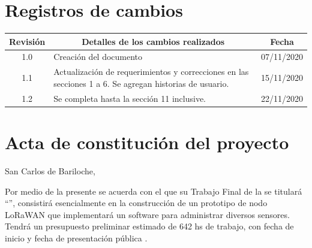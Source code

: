 \documentclass[11pt]{charter}
\begin{document}
\maketitle
\thispagestyle{empty}
\pagebreak


\thispagestyle{empty}
{\setlength{\parskip}{0pt}
\tableofcontents{}
}
\pagebreak


\section{Registros de cambios}
\label{sec:registro}


\begin{table}[ht]
\label{tab:registro}
\centering
\begin{tabularx}{\linewidth}{@{}|c|X|c|@{}}
\hline
\rowcolor[HTML]{C0C0C0} 
Revisión & \multicolumn{1}{c|}{\cellcolor[HTML]{C0C0C0}Detalles de los cambios realizados} & Fecha      \\ \hline
1.0      & Creación del documento                                          & 07/11/2020 \\ \hline
1.1      & Actualización de requerimientos y correcciones en las secciones 1 a 6. Se agregan historias de usuario. & 15/11/2020 \\ \hline
1.2      & Se completa hasta la sección 11 inclusive.                      & 22/11/2020 \\ \hline

\end{tabularx}
\end{table}

\pagebreak



\section{Acta de constitución del proyecto}
\label{sec:acta}

\begin{flushright}
San Carlos de Bariloche, \fechaInicioName
\end{flushright}

\vspace{2cm}

Por medio de la presente se acuerda con el \authorname\hspace{1px} que su Trabajo Final de la \degreename\hspace{1px} se titulará ``\ttitle'', consistirá esencialmente en la construcción de un prototipo de nodo LoRaWAN que implementará un software para administrar diversos sensores. Tendrá un presupuesto preliminar estimado de 642 hs de trabajo, con fecha de inicio \fechaInicioName\hspace{1px} y fecha de presentación pública \fechaFinalName.
\end{document}
